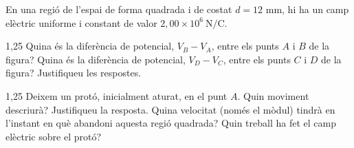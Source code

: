 En una regió de l'espai de forma quadrada i de costat $d = 12$ mm, hi ha un camp elèctric
uniforme i constant de valor $2,00\times 10^{6}\ \mathrm{N/C}$.


\begin{apartat}{1,25}
Quina és la diferència de potencial, $V_B - V_A$, entre els punts $A$ i $B$ de la figura?
Quina és la diferència de potencial, $V_D - V_C$, entre els punts $C$ i $D$ de la figura?
Justifiqueu les respostes.
\end{apartat}

\begin{apartat}{1,25}
Deixem un protó, inicialment aturat, en el punt $A$. Quin moviment descriurà? Justifiqueu
la resposta. Quina velocitat (només el mòdul) tindrà en l'instant en què abandoni aquesta
regió quadrada? Quin treball ha fet el camp elèctric sobre el protó?
\end{apartat}

